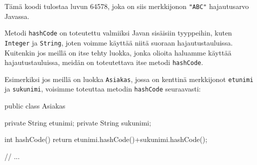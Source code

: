 Tämä koodi tulostaa luvun 64578,
joka on siis merkkijonon \texttt{"ABC"} hajautusarvo Javassa.

Metodi \texttt{hashCode} on toteutettu valmiiksi Javan
sisäisiin tyyppeihin, kuten \texttt{Integer} ja \texttt{String},
joten voimme käyttää niitä suoraan hajautustauluissa.
Kuitenkin jos meillä on itse tehty luokka, jonka olioita
haluamme käyttää hajautustauluissa, meidän on toteutettava
itse metodi \texttt{hashCode}.

Esimerkiksi jos meillä on luokka \texttt{Asiakas},
jossa on kenttinä merkkijonot
\texttt{etunimi} ja \texttt{sukunimi},
voisimme toteuttaa metodin \texttt{hashCode} seuraavasti:

\begin{code}
public class Asiakas {
    private String etunimi;
    private String sukunimi;

    int hashCode() {
        return etunimi.hashCode()+sukunimi.hashCode();
    }

    // ...
}
\end{code}
